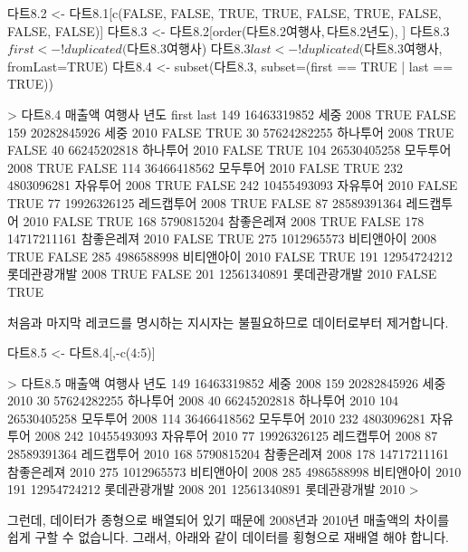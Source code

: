 \begin{Schunk}
\begin{Soutput}
다트8.2 <- 다트8.1[c(FALSE, FALSE, TRUE, TRUE, FALSE, TRUE, FALSE, FALSE, FALSE)]
다트8.3 <- 다트8.2[order(다트8.2$여행사, 다트8.2$년도), ]
다트8.3$first <- !duplicated(다트8.3$여행사)
다트8.3$last <- !duplicated(다트8.3$여행사, fromLast=TRUE)
다트8.4 <- subset(다트8.3, subset=(first == TRUE | last == TRUE))

> 다트8.4
         매출액       여행사 년도 first  last
149 16463319852         세중 2008  TRUE FALSE
159 20282845926         세중 2010 FALSE  TRUE
30  57624282255     하나투어 2008  TRUE FALSE
40  66245202818     하나투어 2010 FALSE  TRUE
104 26530405258     모두투어 2008  TRUE FALSE
114 36466418562     모두투어 2010 FALSE  TRUE
232  4803096281     자유투어 2008  TRUE FALSE
242 10455493093     자유투어 2010 FALSE  TRUE
77  19926326125   레드캡투어 2008  TRUE FALSE
87  28589391364   레드캡투어 2010 FALSE  TRUE
168  5790815204   참좋은레져 2008  TRUE FALSE
178 14717211161   참좋은레져 2010 FALSE  TRUE
275  1012965573   비티앤아이 2008  TRUE FALSE
285  4986588998   비티앤아이 2010 FALSE  TRUE
191 12954724212 롯데관광개발 2008  TRUE FALSE
201 12561340891 롯데관광개발 2010 FALSE  TRUE

\end{Soutput}
\end{Schunk}

처음과 마지막 레코드를 명시하는 지시자는 불필요하므로 데이터로부터 제거합니다.
 
\begin{Schunk}
\begin{Soutput}
다트8.5 <- 다트8.4[,-c(4:5)]

> 다트8.5
         매출액       여행사 년도
149 16463319852         세중 2008
159 20282845926         세중 2010
30  57624282255     하나투어 2008
40  66245202818     하나투어 2010
104 26530405258     모두투어 2008
114 36466418562     모두투어 2010
232  4803096281     자유투어 2008
242 10455493093     자유투어 2010
77  19926326125   레드캡투어 2008
87  28589391364   레드캡투어 2010
168  5790815204   참좋은레져 2008
178 14717211161   참좋은레져 2010
275  1012965573   비티앤아이 2008
285  4986588998   비티앤아이 2010
191 12954724212 롯데관광개발 2008
201 12561340891 롯데관광개발 2010
> 
\end{Soutput}
\end{Schunk}

그런데, 데이터가 종형으로 배열되어 있기 때문에 2008년과 2010년 매출액의 차이를 쉽게 구할 수 없습니다. 
그래서, 아래와 같이 데이터를 횡형으로 재배열 해야 합니다. 

